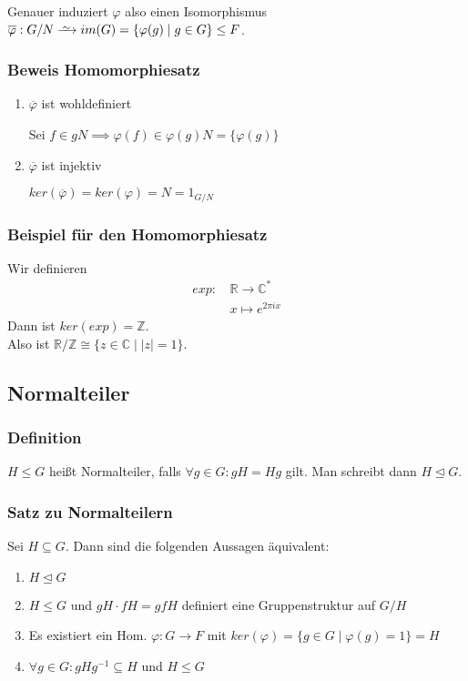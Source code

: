 \documentclass[12pt, german]{article}
\newcommand\iso{\xrightarrow{
		\,\smash{\raisebox{-0.65ex}{\ensuremath{\scriptstyle\sim}}}\,}}
\begin{document}
	Genauer induziert $\varphi$ also einen Isomorphismus $\overline{\varphi}: G/N \iso im(G) = \{\varphi(g) \mid g \in G\} \leq F$.
	
	\subsubsection{Beweis Homomorphiesatz}
	\begin{enumerate}[label=\arabic*)]
		\item $\overline{\varphi}$ ist wohldefiniert ~\par
		Sei $f\in gN \implies \varphi(f) \in \varphi(g)N = \{\varphi(g)\}$
		
		\item $\overline{\varphi}$ ist injektiv ~\par
		$ker(\overline{\varphi}) = ker(\varphi) = N = 1_{G/N}$
	\end{enumerate}
	
	\subsubsection{Beispiel für den Homomorphiesatz}
	Wir definieren 
	\begin{align*}
		exp: &\,\mathbb{R} \to \mathbb{C}^\ast\\
			 &\, x \mapsto e^{2\pi i x}
	\end{align*}
	Dann ist $ker(exp) = \mathbb Z $.\\ 
	Also ist $\mathbb R / \mathbb Z \cong \{z \in \mathbb C \mid |z| = 1\}$.
	
	
	
	\subsection{Normalteiler}		
	\subsubsection{Definition}
	$H \leq G$ hei\ss t Normalteiler, falls $\forall g \in G : gH = Hg$ gilt.
	Man schreibt dann $H\trianglelefteq G$. 
	
	\subsubsection{Satz zu Normalteilern}
	Sei $H \subseteq G$. Dann sind die folgenden Aussagen äquivalent: 
	\begin{enumerate}[label=\arabic*)]
		\item $H\trianglelefteq G$
		\item $H \leq G$ und $gH \cdot fH = gfH$ definiert eine Gruppenstruktur auf $G/H$
		\item Es existiert ein Hom. $\varphi: G \to F$ mit $ker(\varphi) = \{g \in G \mid \varphi(g)= 1\} = H$
		\item $\forall g \in G : gHg^{-1} \subseteq H$ und $H \leq G$
	\end{enumerate}
	
\end{document}
